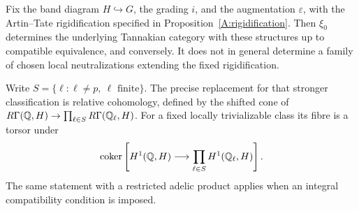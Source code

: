 \begin{proposition}
\label{A:enrichment}
Fix the band diagram $H\hookrightarrow G$, the grading $i$,
and the augmentation $\varepsilon$, with the Artin--Tate
rigidification specified in Proposition~\ref{A:rigidification}.
Then $\xi_0$ determines the underlying Tannakian category with
these structures up to compatible equivalence, and conversely.
It does not in general determine a family of chosen local
neutralizations extending the fixed rigidification.

Write $S=\{\ell:\ell\ne p,\ \ell\text{ finite}\}$. The precise
replacement for that stronger classification is relative
cohomology, defined by the shifted cone of
$R\Gamma(\mathbb Q,H)\to\prod_{\ell\in S}R\Gamma(\mathbb Q_\ell,H)$.
For a fixed locally trivializable class its fibre is a torsor under
\[
 \operatorname{coker}\left[H^1(\mathbb Q,H)\longrightarrow
              \prod_{\ell\in S}H^1(\mathbb Q_\ell,H)\right].
\]
The same statement with a restricted adelic product applies when
an integral compatibility condition is imposed.
\end{proposition}
